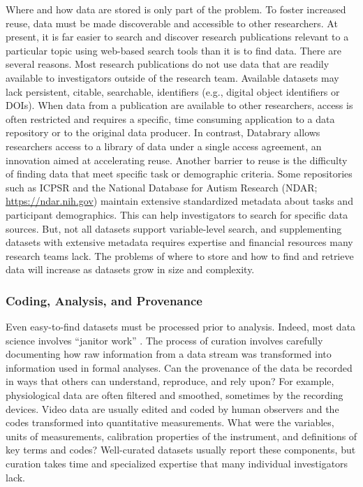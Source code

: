 \documentclass[letterpaper,man,apacite,natbib]{apa6}
\begin{document}
Where and how data are stored is only part of the problem.
To foster increased reuse, data must be made discoverable and accessible to other researchers.
At present, it is far easier to search and discover research publications relevant to a particular topic using web-based search tools than it is to find data.
There are several reasons.
Most research publications do not use data that are readily available to investigators outside of the research team.
Available datasets may lack persistent, citable, searchable, identifiers (e.g., digital object identifiers or DOIs).
When data from a publication are available to other researchers, access is often restricted and requires a specific, time consuming application to a data repository or to the original data producer.
In contrast, Databrary allows researchers access to a library of data under a single access agreement, an innovation aimed at accelerating reuse.
Another barrier to reuse is the difficulty of finding data that meet specific task or demographic criteria.
Some repositories such as ICPSR and the National Database for Autism Research (NDAR; \url{https://ndar.nih.gov}) maintain extensive standardized metadata about tasks and participant demographics.
This can help investigators to search for specific data sources.
But, not all datasets support variable-level search, and supplementing datasets with extensive metadata requires expertise and financial resources many research teams lack.
The problems of where to store and how to find and retrieve data will increase as datasets grow in size and complexity.
\subsubsection{Coding, Analysis, and Provenance}
Even easy-to-find datasets must be processed prior to analysis.
Indeed, most data science involves ``janitor work'' \cite{lohr_for_2014}.
The process of curation involves carefully documenting how raw information from a data stream was transformed into information used in formal analyses. 
Can the provenance of the data be recorded in ways that others can understand, reproduce, and rely upon?
For example, physiological data are often filtered and smoothed, sometimes by the recording devices.
Video data are usually edited and coded by human observers and the codes transformed into quantitative measurements.
What were the variables, units of measurements, calibration properties of the instrument, and definitions of key terms and codes?
Well-curated datasets usually report these components, but curation takes time and specialized expertise that many individual investigators lack.
\end{document}
